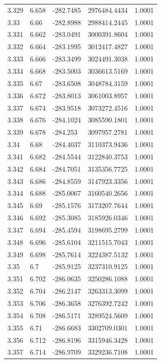 \begin{tabular}{lllll}
3.329 & 6.658 & -282.7485 & 2976484.4434 & 1.0001 \\
3.33 & 6.66 & -282.8988 & 2988414.2445 & 1.0001 \\
3.331 & 6.662 & -283.0491 & 3000391.8604 & 1.0001 \\
3.332 & 6.664 & -283.1995 & 3012417.4827 & 1.0001 \\
3.333 & 6.666 & -283.3499 & 3024491.3038 & 1.0001 \\
3.334 & 6.668 & -283.5003 & 3036613.5169 & 1.0001 \\
3.335 & 6.67 & -283.6508 & 3048784.3159 & 1.0001 \\
3.336 & 6.672 & -283.8013 & 3061003.8957 & 1.0001 \\
3.337 & 6.674 & -283.9518 & 3073272.4516 & 1.0001 \\
3.338 & 6.676 & -284.1024 & 3085590.1801 & 1.0001 \\
3.339 & 6.678 & -284.253 & 3097957.2781 & 1.0001 \\
3.34 & 6.68 & -284.4037 & 3110373.9436 & 1.0001 \\
3.341 & 6.682 & -284.5544 & 3122840.3753 & 1.0001 \\
3.342 & 6.684 & -284.7051 & 3135356.7725 & 1.0001 \\
3.343 & 6.686 & -284.8559 & 3147923.3356 & 1.0001 \\
3.344 & 6.688 & -285.0067 & 3160540.2656 & 1.0001 \\
3.345 & 6.69 & -285.1576 & 3173207.7644 & 1.0001 \\
3.346 & 6.692 & -285.3085 & 3185926.0346 & 1.0001 \\
3.347 & 6.694 & -285.4594 & 3198695.2799 & 1.0001 \\
3.348 & 6.696 & -285.6104 & 3211515.7043 & 1.0001 \\
3.349 & 6.698 & -285.7614 & 3224387.5132 & 1.0001 \\
3.35 & 6.7 & -285.9125 & 3237310.9125 & 1.0001 \\
3.351 & 6.702 & -286.0635 & 3250286.1088 & 1.0001 \\
3.352 & 6.704 & -286.2147 & 3263313.3099 & 1.0001 \\
3.353 & 6.706 & -286.3658 & 3276392.7242 & 1.0001 \\
3.354 & 6.708 & -286.5171 & 3289524.5609 & 1.0001 \\
3.355 & 6.71 & -286.6683 & 3302709.0301 & 1.0001 \\
3.356 & 6.712 & -286.8196 & 3315946.3428 & 1.0001 \\
3.357 & 6.714 & -286.9709 & 3329236.7108 & 1.0001 \\

\end{tabular}
